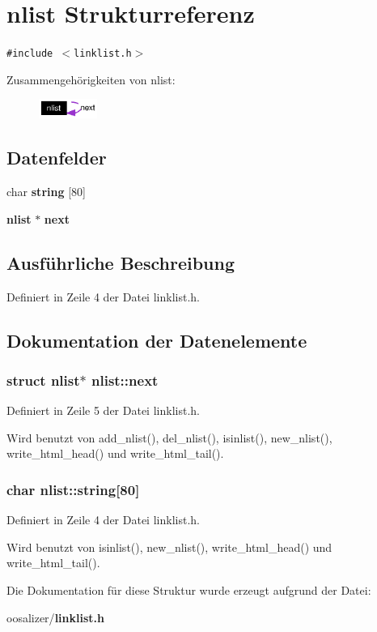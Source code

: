 \section{nlist Strukturreferenz}
\label{structnlist}
{\tt \#include $<$linklist.h$>$}

Zusammengeh\"{o}rigkeiten von nlist:\begin{figure}[H]
\begin{center}
\leavevmode
\includegraphics[width=54pt]{structnlist__coll__graph}
\end{center}
\end{figure}
\subsection*{Datenfelder}
\begin{CompactItemize}
\item 
char {\bf string} [80]
\item 
{\bf nlist} $\ast$ {\bf next}
\end{CompactItemize}


\subsection{Ausf\"{u}hrliche Beschreibung}




Definiert in Zeile 4 der Datei linklist.h.

\subsection{Dokumentation der Datenelemente}
\subsubsection{\setlength{\rightskip}{0pt plus 5cm}struct {\bf nlist}$\ast$ {\bf nlist::next}}\label{structnlist_6e5fbb2f12a2799e60611dbda92c6f38}




Definiert in Zeile 5 der Datei linklist.h.

Wird benutzt von add\_\-nlist(), del\_\-nlist(), isinlist(), new\_\-nlist(), write\_\-html\_\-head() und write\_\-html\_\-tail().
\subsubsection{\setlength{\rightskip}{0pt plus 5cm}char {\bf nlist::string}[80]}\label{structnlist_272774fb3950796b85497317de3dd85a}




Definiert in Zeile 4 der Datei linklist.h.

Wird benutzt von isinlist(), new\_\-nlist(), write\_\-html\_\-head() und write\_\-html\_\-tail().

Die Dokumentation f\"{u}r diese Struktur wurde erzeugt aufgrund der Datei:\begin{CompactItemize}
\item 
oosalizer/{\bf linklist.h}\end{CompactItemize}
